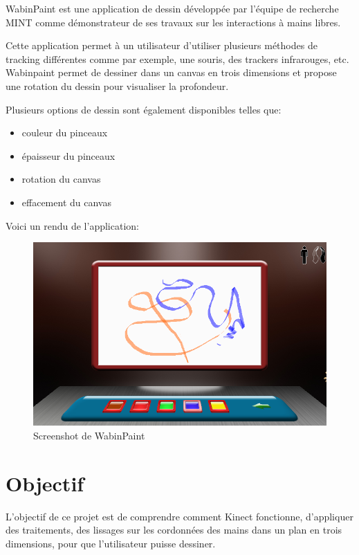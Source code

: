 WabinPaint est une application de dessin développée par l'équipe de recherche MINT comme démonstrateur de ses travaux sur les interactions à mains libres.

Cette application permet à un utilisateur d'utiliser plusieurs méthodes de tracking différentes comme par exemple, une souris, des trackers infrarouges, etc. Wabinpaint permet de dessiner dans un canvas en trois dimensions et propose une rotation du dessin pour visualiser la profondeur.

Plusieurs options de dessin sont également disponibles telles que:
\begin{itemize}
	\item couleur du pinceaux
	\item épaisseur du pinceaux
	\item rotation du canvas
	\item effacement du canvas
\end{itemize}

Voici un rendu de l'application: 
\begin{figure}[!ht]
	\center
	\includegraphics[scale=0.45]{image/wabinpaint.png}
	\caption{Screenshot de WabinPaint}
\end{figure}

\newpage

\section{Objectif}

L'objectif de ce projet est de comprendre comment Kinect fonctionne, d'appliquer des traitements, des lissages sur les cordonnées des mains dans un plan en trois dimensions, pour que l'utilisateur puisse dessiner.

